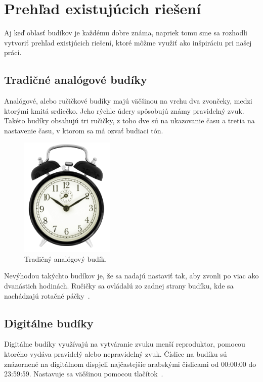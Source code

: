 \chapter{Prehľad existujúcich riešení}
Aj keď oblasť budíkov je každému dobre známa, napriek tomu sme sa rozhodli vytvoriť prehľad existjúcich riešení, ktoré môžme využiť ako inšpiráciu pri našej práci.

\section{Tradičné analógové budíky}
Analógové, alebo ručičkové budíky majú väčšinou na vrchu dva zvončeky, medzi ktorými kmitá srdiečko. Jeho rýchle údery spôsobujú známy pravidelný zvuk. Takéto budíky obsahujú tri ručičky, z toho dve sú na ukazovanie času a tretia na nastavenie času, v ktorom sa má ozvať budiaci tón.

\begin{figure}[h]
    \centering
    \includegraphics[width=0.4\textwidth]{img/analog.jpg}
    \caption{Tradičný analógový budík.}
\end{figure}

Nevýhodou takýchto budíkov je, že sa nadajú nastaviť tak, aby zvonli po viac ako dvanástich hodinách. Ručičky sa ovládalú zo zadnej strany budíku, kde sa nachádzajú rotačné páčky~\cite{hodkin-2015}.

\section{Digitálne budíky}
Digitálne budíky využívajú na vytváranie zvuku menší reproduktor, pomocou ktorého vydáva pravidelý alebo nepravidelný zvuk. Číslice na budíku sú znázornené na digitálnom dispjeli najčastejšie arabskými číslicami od 00:00:00 do 23:59:59. Nastavuje sa väčšinou pomocou tlačítok~\cite{hodkin-2015}.

